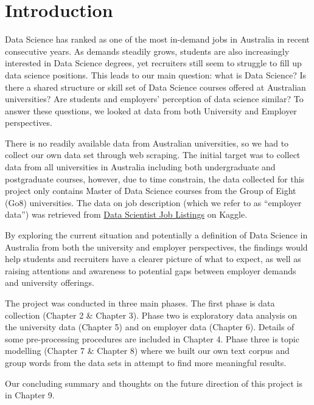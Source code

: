\documentclass[
  letterpaper,
]{report}
\begin{document}

\hypertarget{introduction}{%
\chapter{Introduction}\label{introduction}}

Data Science has ranked as one of the most in-demand jobs in Australia
in recent consecutive years. As demands steadily grows, students are
also increasingly interested in Data Science degrees, yet recruiters
still seem to struggle to fill up data science positions. This leads to
our main question: what is Data Science? Is there a shared structure or
skill set of Data Science courses offered at Australian universities?
Are students and employers' perception of data science similar? To
answer these questions, we looked at data from both University and
Employer perspectives.

There is no readily available data from Australian universities, so we
had to collect our own data set through web scraping. The initial target
was to collect data from all universities in Australia including both
undergraduate and postgraduate courses, however, due to time constrain,
the data collected for this project only contains Master of Data Science
courses from the Group of Eight (Go8) universities. The data on job
description (which we refer to as ``employer data'') was retrieved from
\href{(https://www.kaggle.com/code/nomilk/exploring-2-years-of-data-scientist-job-listings/data)}{Data
Scientist Job Listings} on Kaggle.

By exploring the current situation and potentially a definition of Data
Science in Australia from both the university and employer perspectives,
the findings would help students and recruiters have a clearer picture
of what to expect, as well as raising attentions and awareness to
potential gaps between employer demands and university offerings.

The project was conducted in three main phases. The first phase is data
collection (Chapter 2 \& Chapter 3). Phase two is exploratory data
analysis on the university data (Chapter 5) and on employer data
(Chapter 6). Details of some pre-processing procedures are included in
Chapter 4. Phase three is topic modelling (Chapter 7 \& Chapter 8) where
we built our own text corpus and group words from the data sets in
attempt to find more meaningful results.

Our concluding summary and thoughts on the future direction of this
project is in Chapter 9.
\end{document}
